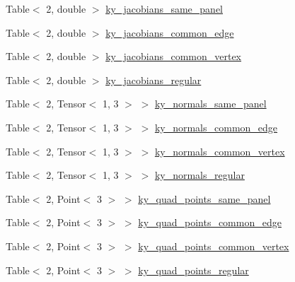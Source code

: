 \begin{DoxyCompactItemize}
\item 
Table$<$ 2, double $>$ \hyperlink{structLaplaceBEM_1_1PairCellWiseScratchData_a914eb8a2b848a3008eea85c35fc012a3}{ky\+\_\+jacobians\+\_\+same\+\_\+panel}
\item 
Table$<$ 2, double $>$ \hyperlink{structLaplaceBEM_1_1PairCellWiseScratchData_aeac246863ee663cd5b977cbb51809542}{ky\+\_\+jacobians\+\_\+common\+\_\+edge}
\item 
Table$<$ 2, double $>$ \hyperlink{structLaplaceBEM_1_1PairCellWiseScratchData_a0a5c02d73cbf27f1c1b8bf4347bc6149}{ky\+\_\+jacobians\+\_\+common\+\_\+vertex}
\item 
Table$<$ 2, double $>$ \hyperlink{structLaplaceBEM_1_1PairCellWiseScratchData_a712bbca9fc35f6953a235cc0950c35d7}{ky\+\_\+jacobians\+\_\+regular}
\item 
Table$<$ 2, Tensor$<$ 1, 3 $>$ $>$ \hyperlink{structLaplaceBEM_1_1PairCellWiseScratchData_ab2ff0498846ca2cb6683f3f16b52b1ed}{ky\+\_\+normals\+\_\+same\+\_\+panel}
\item 
Table$<$ 2, Tensor$<$ 1, 3 $>$ $>$ \hyperlink{structLaplaceBEM_1_1PairCellWiseScratchData_a428bf1cd494daa754755bf8905742fbc}{ky\+\_\+normals\+\_\+common\+\_\+edge}
\item 
Table$<$ 2, Tensor$<$ 1, 3 $>$ $>$ \hyperlink{structLaplaceBEM_1_1PairCellWiseScratchData_aa0c83da483b1ec968e1c9b836d5c684a}{ky\+\_\+normals\+\_\+common\+\_\+vertex}
\item 
Table$<$ 2, Tensor$<$ 1, 3 $>$ $>$ \hyperlink{structLaplaceBEM_1_1PairCellWiseScratchData_ab00760b52f17c91294da7651c21937ee}{ky\+\_\+normals\+\_\+regular}
\item 
Table$<$ 2, Point$<$ 3 $>$ $>$ \hyperlink{structLaplaceBEM_1_1PairCellWiseScratchData_a78dd048ae70be7b101eb670a6c89e75d}{ky\+\_\+quad\+\_\+points\+\_\+same\+\_\+panel}
\item 
Table$<$ 2, Point$<$ 3 $>$ $>$ \hyperlink{structLaplaceBEM_1_1PairCellWiseScratchData_aa777424b41016df40f6d0afce84debab}{ky\+\_\+quad\+\_\+points\+\_\+common\+\_\+edge}
\item 
Table$<$ 2, Point$<$ 3 $>$ $>$ \hyperlink{structLaplaceBEM_1_1PairCellWiseScratchData_acf4cc1caefb3a07b069d0fb67b2891c6}{ky\+\_\+quad\+\_\+points\+\_\+common\+\_\+vertex}
\item 
Table$<$ 2, Point$<$ 3 $>$ $>$ \hyperlink{structLaplaceBEM_1_1PairCellWiseScratchData_abb536bc3bd66be66d8dcd96bc144859e}{ky\+\_\+quad\+\_\+points\+\_\+regular}
\end{DoxyCompactItemize}


